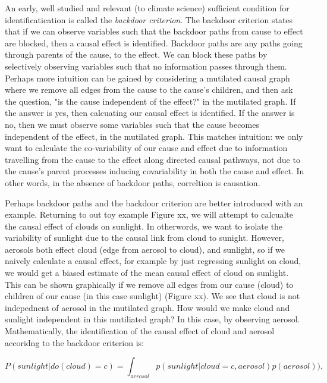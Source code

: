 \documentclass[12pt]{article}
\begin{document}
An early, well studied and relevant (to climate science)
sufficient condition for identificatication is called the
\emph{backdoor criterion}. The backdoor criterion states that if we can
observe variables such that the backdoor paths from cause to
effect are blocked, then a causal effect is identified. Backdoor
paths are any paths going through parents of the cause, to the
effect. We can block these paths by selectively observing
variables such that no information passes through them. Perhaps
more intuition can be gained by considering a mutilated causal
graph where we remove all edges from the cause to the cause's
children, and then ask the question, "is the cause independent of
the effect?" in the mutilated graph. If the answer is yes, then
calcuating our causal effect is identified. If the answer is no,
then we must observe some variables such that the cause becomes
independent of the effect, in the mutilated graph. This matches
intuition: we only want to calculate the co-variability of our
cause and effect due to information travelling from the cause to
the effect along directed causal pathways, not due to the cause's
parent processes inducing covariability in both the cause and
effect. In other words, in the absence of backdoor paths,
correltion is causation.


Perhaps backdoor paths and the backdoor criterion are better
introduced with an example. Returning to out toy example Figure
xx, we will attempt to calcualte the causal effect of clouds on
sunlight. In otherwords, we want to isolate the variability of
sunlight due to the causal link from cloud to sunight. However,
aerosols both effect cloud (edge from aerosol to cloud), and
sunlight, so if we naively calculate a causal effect, for example
by just regressing sunlight on cloud, we would get a biased
estimate of the mean causal effect of cloud on sunlight. This can
be shown graphically if we remove all edges from our cause (cloud)
to children of our cause (in this case sunlight) (Figure xx). We
see that cloud is not indepednent of aerosol in the mutilated
graph. How would we make cloud and sunlight independent in this
mutiliated graph? In this case, by observing
aerosol. Mathematically, the identification of the causal effect
of cloud and aerosol accoridng to the backdoor criterion is:

\begin{equation}
  P(sunlight | do(cloud) = c) = \int_{aerosol} p(sunlight| cloud = c,
  aerosol) p(aerosol)),
\end{equation}
\end{document}
